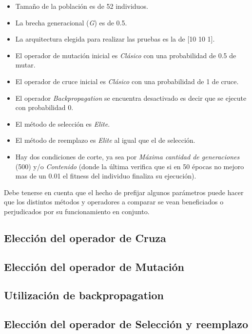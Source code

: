\documentclass{sig-alternate}
\begin{document}
	\begin{itemize}
		\item Tamaño de la población es de 52 individuos.
		\item La brecha generacional (\textit{G}) es de 0.5.
		\item La arquitectura elegida para realizar las pruebas es la de [10 10 1].
		\item El operador de mutación inicial es \textit{Clásico} con una probabilidad de 0.5 de mutar.
		\item El operador de cruce inicial es \textit{Clásico} con una probabilidad de 1 de cruce.
		\item El operador \textit{Backpropagation} se encuentra desactivado es decir que se ejecute con probabilidad 0.
		\item El método de selección es \textit{Elite}.
		\item El método de reemplazo es \textit{Elite} al igual que el de selección.
		\item Hay dos condiciones de corte, ya sea por \textit{Máxima cantidad de generaciones} (500) y/o \textit{Contenido} (donde la última verifica que si en 50 épocas no mejoro mas de un 0.01 el fitness del individuo finaliza su ejecución).
	\end{itemize}

	Debe tenerse en cuenta que el hecho de prefijar algunos parámetros puede hacer que los distintos métodos y operadores a comparar se vean beneficiados o perjudicados por su funcionamiento en conjunto.

	\subsection{Elección del operador de Cruza}

	\subsection{Elección del operador de Mutación}

	\subsection{Utilización de backpropagation}

	\subsection{Elección del operador de Selección y reemplazo}
\end{document}
